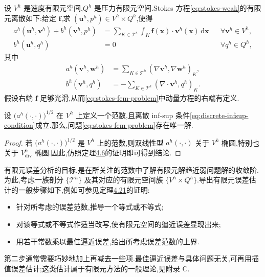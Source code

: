 \begin{note}[有限元表述]\label{note:stokes-finite-element-formulation}
设 $V^h$ 是速度有限元空间,$Q^h$ 是压力有限元空间.Stokes 方程\cref{eq:stokes-weak}的有限元离散如下:给定 $\bm{f}$,求 $(\bm{u}^h,p^h)\in V^h\times Q^h$,使得
\begin{equation}\label{eq:stokes-fem-problem}
\begin{aligned}
  a^h(\bm{u}^h,\bm{v}^h)
      +b^h(\bm{v}^h,p^h)
   &=\sum_{K\in\mathcal{T}^h}
       \int_K\bm{f}(\bm{x})\cdot\bm{v}^h(\bm{x})\,\mathrm{d}\bm{x}
       &&\forall\bm{v}^h\in V^h,\\
  b^h(\bm{u}^h,q^h)&=0
       &&\forall q^h\in Q^h,
\end{aligned}
\end{equation}
其中
\begin{equation}\label{eq:stokes-fem-bilinear-forms}
\begin{aligned}
  a^h(\bm{v}^h,\bm{w}^h)
    &=\sum_{K\in\mathcal{T}^h}
        (\nabla\bm{v}^h,\nabla\bm{w}^h)_K,\\
  b^h(\bm{v}^h,q^h)
    &=-\sum_{K\in\mathcal{T}^h}
        (\nabla\cdot\bm{v}^h,q^h)_K.
\end{aligned}
\end{equation}
假设右端 $\bm{f}$ 足够光滑,从而\cref{eq:stokes-fem-problem}中动量方程的右端有定义.
\end{note}

\begin{theorem}\label{thm:stokes-fem-existence}
设 $\bigl(a^h(\cdot,\cdot)\bigr)^{1/2}$ 在 $V^h$ 上定义一个范数,且离散 inf-sup 条件\cref{eq:discrete-infsup-condition}成立.那么,问题\cref{eq:stokes-fem-problem}存在唯一解.
\end{theorem}
\begin{proof}
若 $\bigl(a^h(\cdot,\cdot)\bigr)^{1/2}$ 是 $V^h$ 上的范数,则双线性型 $a^h(\cdot,\cdot)$ 关于 $V^h$ 椭圆,特别也关于 $V_{\mathrm{div}}^h$ 椭圆.因此,仿照定理\hyperref[thm:stokes-4-6]{4.6}的证明即可得到结论.
\end{proof}

\begin{note}[目标与思路]\label{note:stokes-error-analysis-goal}
有限元误差分析的目标,是在所关注的范数中了解有限元解趋近弱问题解的收敛阶.为此,考虑一族剖分 $\{\mathcal{T}^h\}$ 及其对应的有限元空间族 $\{V^h\times Q^h\}$.导出有限元误差估计的一般步骤如下,例如可参见定理\hyperref[thm:stokes-error-velocity-h1]{4.21}的证明:
\begin{itemize}
  \item 针对所考虑的误差范数,推导一个等式或不等式;
  \item 对该等式或不等式作适当改写,使有限元空间的逼近误差显现出来;
  \item 用若干常数乘以最佳逼近误差,给出所考虑误差范数的上界.
\end{itemize}
第二步通常需要巧妙地加上再减去一些项.最佳逼近误差与具体问题无关,可再用插值误差估计;这类估计属于有限元方法的一般理论,见附录 C.
\end{note}

